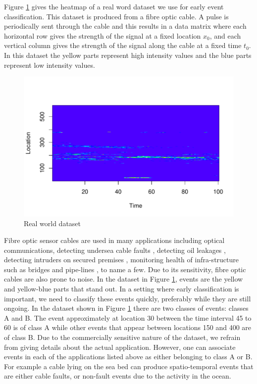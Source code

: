 \documentclass[11pt]{article}
\begin{document}
	Figure \ref{fig:Real_World_Data} gives the heatmap of a real word dataset we use for early event classification. This dataset is produced from a fibre optic  cable. A pulse is periodically sent through the cable and this results in a data matrix where each horizontal row gives the strength of the signal at a fixed location $x_0$, and each vertical column gives the strength of the signal along the cable at a fixed time $t_0$.  In this dataset the yellow parts represent high intensity values and the blue parts represent low intensity values. 
	
	\begin{figure}[H]
	\centering
	\includegraphics{./Graphics/Real_World.pdf}  %
	\caption{\footnotesize Real world dataset}
	\label{fig:Real_World_Data}
	\end{figure}
	
	Fibre optic sensor cables are used in many applications including optical communications, detecting undersea cable faults \cite{jiang2009technological}, detecting oil leakages \cite{nikles2004leakage}, detecting intruders on secured premises \cite{griffiths1995developments}, monitoring health of infra-structure such as bridges and pipe-lines \cite{li2004recent}, to name a few. Due to its sensitivity, fibre optic cables are also prone to noise. In the dataset in Figure \ref{fig:Real_World_Data}, events are the yellow and yellow-blue parts that stand out. In a setting where early classification is  important, we need to classify these events quickly, preferably while they are still ongoing. In the dataset shown in Figure \ref{fig:Real_World_Data} there are two classes of events: classes A and B. The event approximately at location 30 between the time interval  45 to 60 is of class A while other events that appear between locations 150 and 400  are of class B. Due to the commercially sensitive nature of the dataset, we refrain from giving details about the actual application. However, one can associate events in each of the applications listed above as either belonging to class A or B. For example a cable lying on the sea bed can produce spatio-temporal events that are either cable faults, or non-fault events due to the activity in the ocean. 
	
\end{document}
